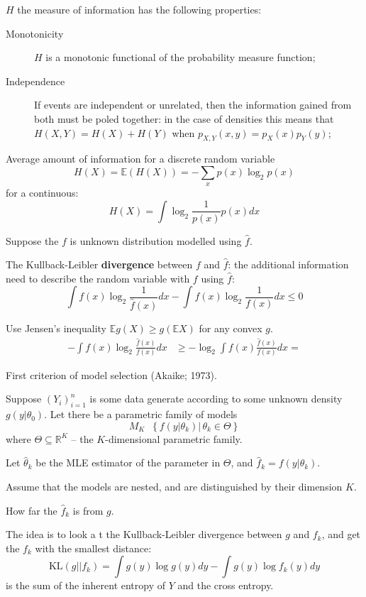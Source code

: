 \documentclass[a4paper]{article}
\newcommand{\obj}[1]{{\left\{ #1 \right \}}}
\newcommand{\brac}[1]{{\left ( #1 \right )}}
\newcommand{\induc}[1]{{\left . #1 \right \vert}}
\newcommand{\Real}{\mathbb{R}}
\newcommand{\Ex}[0]{{\mathbb{E}}}
\newcommand{\defn}{\mathop{\overset{\Delta}{=}}\nolimits}
\begin{document}
$H$ the measure of information has the following properties: \begin{description}
	\item[Monotonicity] $H$ is a monotonic functional of the probability measure function;
	\item[Independence] If events are independent or unrelated, then the information gained from both must be poled together: in the case of densities this means that $H(X,Y) = H(X)+H(Y)$ when $p_{X,Y}(x,y) = p_X(x) p_Y(y)$;
	\item[]
\end{description}

Average amount of information for a discrete random variable
\[H(X) = \Ex\brac{H(X)} = - \sum_x p(x) \log_2 p(x)\]
for a continuous:
\[H(X) = \int \log_2\frac{1}{p(x)} p(x) dx\]

Suppose the $f$ is unknown distribution modelled using $\hat{f}$.

The Kullback-Leibler \textbf{divergence} between $f$ and $\hat{f}$: the additional information need to describe the random variable with $f$ using $\hat{f}$: \[\int f(x) \log_2\frac{1}{\hat{f}(x)} dx - \int f(x) \log_2\frac{1}{f(x)} dx \leq 0 \]

Use Jensen's inequality $\Ex g(X) \geq g\brac{\Ex X}$ for any convex $g$.
\begin{align*}
	-\int f(x) \log_2\frac{\hat{f}(x)}{f(x)} dx & \geq -\log_2\int f(x) \frac{\hat{f}(x)}{f(x)}  dx = 
\end{align*}

First criterion of model selection (Akaike; 1973).

Suppose $\brac{Y_i}_{i=1}^n$ is some data generate according to some unknown density $g\brac{\induc{y}\theta_0}$. Let there be a parametric family of models
\[M_K \defn \obj{\induc{f\brac{\induc{y}\theta_k}}\,\theta_k\in \Theta}\]
where $\Theta\subseteq \Real^K$ -- the $K$-dimensional parametric family.

Let $\hat{\theta}_k$ be the MLE estimator of the parameter in $\Theta$, and $\hat{f}_k = f\brac{\induc{y}\theta_k}$.

Assume that the models are nested, and are distinguished by their dimension $K$.

How far the $\hat{f}_k$ is from $g$.

The idea is to look a t the Kullback-Leibler divergence between $g$ and $f_k$, and get the $f_k$ with the smallest distance:
\[\text{KL}(g||f_k) = \int g(y) \log g(y) dy - \int g(y) \log f_k(y) dy\]
is the sum of the inherent entropy of $Y$ and the cross entropy.
\end{document}

